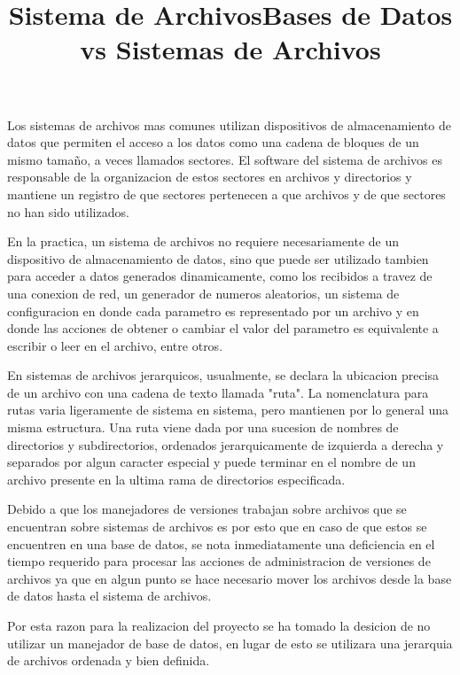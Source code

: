 \title{Sistema de Archivos}

Los sistemas de archivos mas comunes utilizan dispositivos de almacenamiento de datos que permiten el acceso a los datos como una cadena de bloques de un mismo tamaño, a veces llamados sectores. El software del sistema de archivos es responsable de la organizacion de estos sectores en archivos y directorios y mantiene un registro de que sectores pertenecen a que archivos y de que sectores no han sido utilizados.

En la practica, un sistema de archivos no requiere necesariamente de un dispositivo de almacenamiento de datos, sino que puede ser utilizado tambien para acceder a datos generados dinamicamente, como los recibidos a travez de una conexion de red, un generador de numeros aleatorios, un sistema de configuracion en donde cada parametro es representado por un archivo y en donde las acciones de obtener o cambiar el valor del parametro es equivalente a escribir o leer en el archivo, entre otros.

En sistemas de archivos jerarquicos, usualmente, se declara la ubicacion precisa de un archivo con una cadena de texto llamada "ruta". La nomenclatura para rutas varia ligeramente de sistema en sistema, pero mantienen por lo general una misma estructura. Una ruta viene dada por una sucesion de nombres de directorios y subdirectorios, ordenados jerarquicamente de izquierda a derecha y separados por algun caracter especial y puede terminar en el nombre de un archivo presente en la ultima rama de directorios especificada.

\title{Bases de Datos vs Sistemas de Archivos}

Debido a que los manejadores de versiones trabajan sobre archivos que se encuentran sobre sistemas de archivos es por esto que en caso de que estos se encuentren en una base de datos, se nota inmediatamente una deficiencia en el tiempo requerido para procesar las acciones de administracion de versiones de archivos ya que en algun punto se hace necesario mover los archivos desde la base de datos hasta el sistema de archivos.

Por esta razon para la realizacion del proyecto se ha tomado la desicion de no utilizar un manejador de base de datos, en lugar de esto se utilizara una jerarquia de archivos ordenada y bien definida.
